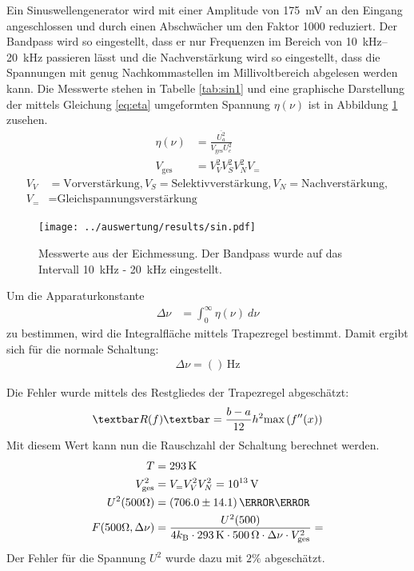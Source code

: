 Ein Sinuswellengenerator wird mit einer Amplitude von \SI{175}{\milli\volt} an den Eingang angeschlossen und durch einen Abschwächer um den Faktor 1000 reduziert. Der Bandpass wird so eingestellt, dass er nur Frequenzen im Bereich von \SIrange{10}{20}{\kilo\hertz} passieren lässt und die Nachverstärkung wird so eingestellt, dass die Spannungen mit genug Nachkommastellen im Millivoltbereich abgelesen werden kann. Die Messwerte stehen in Tabelle \ref{tab:sin1} und eine graphische Darstellung der mittels Gleichung \ref{eq:eta} umgeformten Spannung $\eta(\nu)$ ist in Abbildung \ref{fig:eichmessung} zusehen.
\begin{align}
	\eta(\nu) &= \frac{\overline{U^2_a}}{V_\text{ges}U^2_e}
	\label{eq:eta}\\
	V_\text{ges} &= V_V^2V_S^2V_N^2V_=
\end{align}
\begin{align*}
	V_V &= \text{Vorverstärkung}, V_S = \text{Selektivverstärkung}, V_N = \text{Nachverstärkung},\\ V_=&=\text{Gleichspannungsverstärkung}
\end{align*}
\begin{figure}[h]
	\texttt{[image: ../auswertung/results/sin.pdf]}
	\caption{Messwerte aus der Eichmessung. Der Bandpass wurde auf das Intervall \SI{10}{\kilo\hertz} - \SI{20}{\kilo\hertz} eingestellt.}
	\label{fig:eichmessung}
\end{figure}


Um die Apparaturkonstante
\begin{align}
	\Delta\nu &= \int_0^\infty \eta(\nu)\ d\nu
\end{align}
zu bestimmen, wird die Integralfläche mittels Trapezregel bestimmt.
Damit ergibt sich für die normale Schaltung:
\begin{align}
\Delta\nu = ()\, \si{\hertz}
\end{align}

Die Fehler wurde mittels des Restgliedes der Trapezregel abgeschätzt:
\begin{align}
	\textbar R(f)\textbar = \frac{b-a}{12}h^2\text{max}\left(f''(x)\right)
	\label{eq:restglied}
\end{align}
Mit diesem Wert kann nun die Rauschzahl der Schaltung berechnet werden. 
\begin{align*}
	T &= \SI{293}{\kelvin}\\
	V^2_\text{ges} &= V_=V^2_VV^2_N = 10^{13}\, \si{\volt}\\
	U^2(500\Omega) &= (706.0\pm 14.1)\,{\milli\volt}\\
	F(500\Omega, \Delta\nu) &= \frac{U^2(500)}{4k_\text{B} \cdot \SI{293}{\kelvin} \cdot \SI{500}{\ohm} \cdot \Delta\nu \cdot V^2_\text{ges}} = 
\end{align*}
Der Fehler für die Spannung $U^2$ wurde dazu mit $2\%$ abgeschätzt.\\

